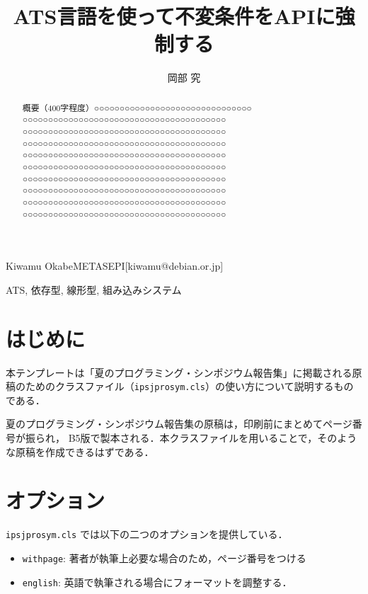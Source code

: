 \documentclass{ipsjprosym}
\begin{document}
\title{ATS言語を使って不変条件をAPIに強制する}


\author{岡部 究}{Kiwamu Okabe}{METASEPI}[kiwamu@debian.or.jp]

\begin{abstract}
概要（400字程度）○○○○○○○○○○○○○○○○○○○○○○○○○○○○○○○
○○○○○○○○○○○○○○○○○○○○○○○○○○○○○○○○○○○○○○○○
○○○○○○○○○○○○○○○○○○○○○○○○○○○○○○○○○○○○○○○○
○○○○○○○○○○○○○○○○○○○○○○○○○○○○○○○○○○○○○○○○
○○○○○○○○○○○○○○○○○○○○○○○○○○○○○○○○○○○○○○○○
○○○○○○○○○○○○○○○○○○○○○○○○○○○○○○○○○○○○○○○○
○○○○○○○○○○○○○○○○○○○○○○○○○○○○○○○○○○○○○○○○
○○○○○○○○○○○○○○○○○○○○○○○○○○○○○○○○○○○○○○○○
○○○○○○○○○○○○○○○○○○○○○○○○○○○○○○○○○○○○○○○○
○○○○○○○○○○○○○○○○○○○○○○○○○○○○○○○○○○○○○○○○
\end{abstract}

\begin{jkeyword}
ATS, 依存型, 線形型, 組み込みシステム
\end{jkeyword}

\maketitle

\section{はじめに}

本テンプレートは「夏のプログラミング・シンポジウム報告集」に掲載される原
稿のためのクラスファイル（\verb|ipsjprosym.cls|）の使い方について説明するものである．

夏のプログラミング・シンポジウム報告集の原稿は，印刷前にまとめてページ番号が振られ，
B5版で製本される．本クラスファイルを用いることで，そのような原稿を作成できるはずである．

\section{オプション}

\verb|ipsjprosym.cls| では以下の二つのオプションを提供している．
\begin{itemize}
 \item \verb|withpage|: 著者が執筆上必要な場合のため，ページ番号をつける
 \item \verb|english|: 英語で執筆される場合にフォーマットを調整する．
\end{itemize}
\end{document}
